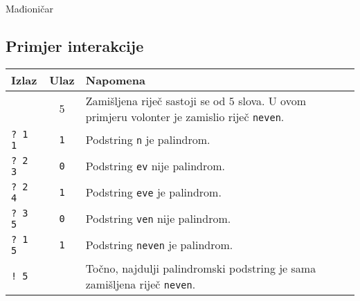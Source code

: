 \begin{statement}[
  problempoints=100,
  timelimit=1 sekunda,
  memorylimit=512 MiB,
]{Mađioničar}
\subsection*{Primjer interakcije}
{\renewcommand{\arraystretch}{1.4}
  \setlength{\tabcolsep}{6pt}
  \begin{tabular}{lcl}
    Izlaz & Ulaz & Napomena \\ \midrule
      & 5 & Zamišljena riječ sastoji se od $5$ slova. U ovom primjeru volonter je zamislio riječ \texttt{neven}. \\
    \texttt{\frenchspacing? 1 1} & \texttt{1} & Podstring \texttt{n} je palindrom. \\
    \texttt{\frenchspacing? 2 3} & \texttt{0} & Podstring \texttt{ev} nije palindrom. \\
    \texttt{\frenchspacing? 2 4} & \texttt{1} & Podstring \texttt{eve} je palindrom. \\
    \texttt{\frenchspacing? 3 5} & \texttt{0} & Podstring \texttt{ven} nije palindrom. \\
    \texttt{\frenchspacing? 1 5} & \texttt{1} & Podstring \texttt{neven} je palindrom. \\
    \texttt{\frenchspacing! 5} & & Točno, najdulji palindromski podstring je sama zamišljena riječ \texttt{neven}. \\
\end{tabular}}


\end{statement}

